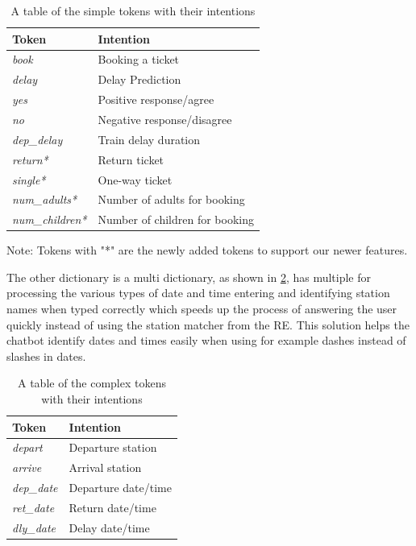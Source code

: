 \documentclass[11pt]{article}
\begin{document}
    \begin{table}[!ht]
\centering
\begin{tabular}{|l|l|}
\hline
\textbf{Token}      & \textbf{Intention}         \\ \hline
\textit{book}       & Booking a ticket           \\ \hline
\textit{delay}      & Delay Prediction           \\ \hline
\textit{yes}        & Positive response/agree    \\ \hline
\textit{no}         & Negative response/disagree \\ \hline
\textit{dep\_delay} & Train delay duration       \\ \hline
\textit{return*}     & Return ticket              \\ \hline
\textit{single*}     & One-way ticket             \\ \hline
\textit{num\_adults*} & Number of adults for booking       \\ \hline
\textit{num\_children*} & Number of children for booking       \\ \hline
\end{tabular}
\caption{A table of the simple tokens with their intentions}
Note: Tokens with "*" are the newly added tokens to support our newer features.
\label{tab:SimpleTokenNLP}
\end{table}
    
    
    The other dictionary is a multi dictionary, as shown in \cref{tab:ComplexTokenNLP}, has multiple for processing the various types of date and time entering and identifying station names when typed correctly which speeds up the process of answering the user quickly instead of using the station matcher from the RE. This solution helps the chatbot identify dates and times easily when using for example dashes instead of slashes in dates.
    
    \begin{table}[!ht]
\centering
\begin{tabular}{|l|l|}
\hline
\textbf{Token}     & \textbf{Intention}  \\ \hline
\textit{depart}    & Departure station   \\ \hline
\textit{arrive}    & Arrival station     \\ \hline
\textit{dep\_date} & Departure date/time \\ \hline
\textit{ret\_date} & Return date/time    \\ \hline
\textit{dly\_date} & Delay date/time     \\ \hline
\end{tabular}
\caption{A table of the complex tokens with their intentions}
\label{tab:ComplexTokenNLP}
\end{table}
\end{document}
